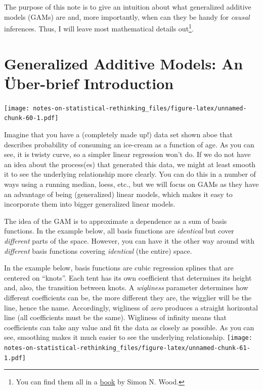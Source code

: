 \documentclass[
]{book}
\begin{document}
The purpose of this note is to give an intuition about what generalized additive models (GAMs) are and, more importantly, when can they be handy for \emph{causal} inferences. Thus, I will leave most mathematical details out\footnote{You can find them all in a \href{https://www.routledge.com/Generalized-Additive-Models-An-Introduction-with-R-Second-Edition/Wood/p/book/9781498728331}{book} by Simon N. Wood.}.

\hypertarget{generalized-additive-models-an-uxfcber-brief-introduction}{%
\section{Generalized Additive Models: An Über-brief Introduction}\label{generalized-additive-models-an-uxfcber-brief-introduction}}

\texttt{[image: notes-on-statistical-rethinking\_files/figure-latex/unnamed-chunk-60-1.pdf]}

Imagine that you have a (completely made up!) data set shown aboe that describes probability of consuming an ice-cream as a function of age. As you can see, it is twisty curve, so a simpler linear regression won't do. If we do not have an idea about the process(es) that generated this data, we might at least smooth it to see the underlying relationship more clearly. You can do this in a number of ways using a running median, loess, etc., but we will focus on GAMs as they have an advantage of being (generalized) linear models, which makes it easy to incorporate them into bigger generalized linear models.

The idea of the GAM is to approximate a dependence as a sum of basis functions. In the example below, all basis functions are \emph{identical} but cover \emph{different} parts of the space. However, you can have it the other way around with \emph{different} basis functions covering \emph{identical} (the entire) space.

In the example below, basis functions are cubic regression splines that are centered on ``knots''. Each tent has its own coefficient that determines its height and, also, the transition between knots. A \emph{wigliness} parameter determines how different coefficients can be, the more different they are, the wigglier will be the line, hence the name. Accordingly, wigliness of \emph{zero} produces a straight horizontal line (all coefficients must be the same). Wigliness of infinity means that coefficients can take any value and fit the data as closely as possible. As you can see, smoothing makes it much easier to see the underlying relationship.
\texttt{[image: notes-on-statistical-rethinking\_files/figure-latex/unnamed-chunk-61-1.pdf]}
\end{document}
